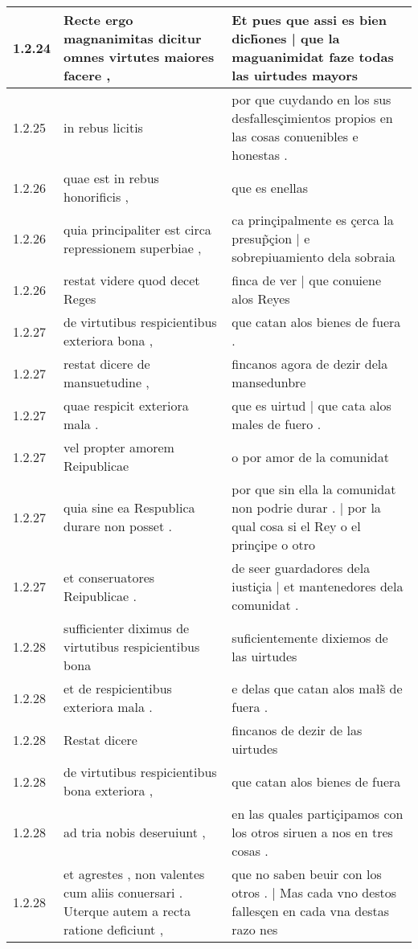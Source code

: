 \begin{tabular}{|p{1cm}|p{6.5cm}|p{6.5cm}|}
1.2.24 & Recte ergo magnanimitas dicitur omnes virtutes maiores facere , & Et pues que assi es bien dich̃ones | que la maguanimidat faze todas las uirtudes mayors \\\hline
1.2.25 & in rebus licitis & por que cuydando en los sus desfallesçimientos propios en las cosas conuenibles e honestas . \\\hline
1.2.26 & quae est in rebus honorificis , & que es enellas \\\hline
1.2.26 & quia principaliter est circa repressionem superbiae , & ca prinçipalmente es çerca la presup̃çion | e sobrepiuamiento dela sobraia \\\hline
1.2.26 & restat videre quod decet Reges & finca de ver | que conuiene alos Reyes \\\hline
1.2.27 & de virtutibus respicientibus exteriora bona , & que catan alos bienes de fuera . \\\hline
1.2.27 & restat dicere de mansuetudine , & fincanos agora de dezir dela mansedunbre \\\hline
1.2.27 & quae respicit exteriora mala . & que es uirtud | que cata alos males de fuero . \\\hline
1.2.27 & vel propter amorem Reipublicae & o por amor de la comunidat \\\hline
1.2.27 & quia sine ea Respublica durare non posset . & por que sin ella la comunidat non podrie durar . | por la qual cosa si el Rey o el prinçipe o otro \\\hline
1.2.27 & et conseruatores Reipublicae . & de seer guardadores dela iustiçia | et mantenedores dela comunidat . \\\hline
1.2.28 & sufficienter diximus de virtutibus respicientibus bona & suficientemente dixiemos de las uirtudes \\\hline
1.2.28 & et de respicientibus exteriora mala . & e delas que catan alos małs̃ de fuera . \\\hline
1.2.28 & Restat dicere & fincanos de dezir de las uirtudes \\\hline
1.2.28 & de virtutibus respicientibus bona exteriora , & que catan alos bienes de fuera \\\hline
1.2.28 & ad tria nobis deseruiunt , & en las quales partiçipamos con los otros siruen a nos en tres cosas . \\\hline
1.2.28 & et agrestes , non valentes cum aliis conuersari . Uterque autem a recta ratione deficiunt , & que no saben beuir con los otros . | Mas cada vno destos fallesçen en cada vna destas razo nes \\\hline

\end{tabular}
